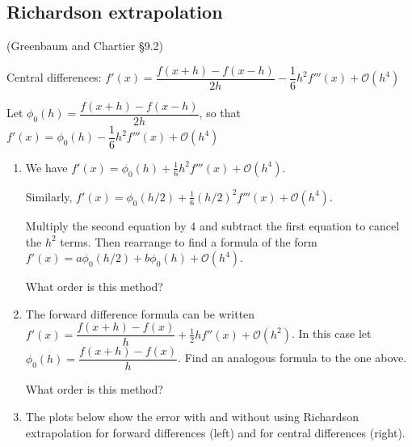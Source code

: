 \documentclass[12pt,letterpaper,noanswers]{exam}
\begin{document}



\subsection*{Richardson extrapolation}

\begin{tcolorbox}

(Greenbaum and Chartier \S 9.2)

Central differences: $f'(x) = \dfrac{f(x+h)-f(x-h)}{2h} - \dfrac{1}{6}h^2 f'''(x) + \mathcal{O}(h^4)$

Let $\phi_0(h) = \dfrac{f(x+h)-f(x-h)}{2h}$, so that $f'(x) = \phi_0(h) - \dfrac{1}{6}h^2 f'''(x) + \mathcal{O}(h^4)$
\end{tcolorbox}
\begin{enumerate}[resume=classQ]
\item We have $f'(x) = \phi_0(h) + \frac{1}{6}h^2 f'''(x) + \mathcal{O}(h^4)$.

Similarly, $f'(x) = \phi_0(h/2) + \frac{1}{6}(h/2)^2 f'''(x) +  \mathcal{O}(h^4)$.

Multiply the second equation by $4$ and subtract the first equation to cancel the $h^2$ terms.  Then rearrange to find a formula of the form $f'(x) = a\phi_0(h/2) + b\phi_0(h) + \mathcal{O}(h^4)$.

What order is this method?
\vspace{1in}

\item The forward difference formula can be written $f'(x) = \dfrac{f(x+h)-f(x)}{h} + \frac{1}{2} hf''(x) + \mathcal{O}(h^2)$.  In this case let $\phi_0(h) = \dfrac{f(x+h)-f(x)}{h}$.  Find an analogous formula to the one above.

What order is this method?

\vspace{1in}

\item The plots below show the error with and without using Richardson extrapolation for forward differences (left) and for central differences (right).
\end{enumerate}
\end{document}
